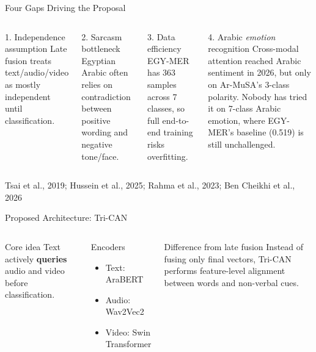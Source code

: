 \documentclass[aspectratio=169,10pt]{beamer}
\newcommand{\term}[1]{\textbf{\textcolor{MidBlue}{#1}}}
\newcommand{\source}[1]{\vspace{0.05cm}\hfill{\scriptsize\textcolor{MutedGray}{#1}}}
\newcommand{\keytake}[1]{\vspace{0.3em}{\small #1}}
\begin{document}
\begin{frame}[t]{Four Gaps Driving the Proposal}
\begin{columns}[T,onlytextwidth]
\begin{block}{1. Independence assumption}
Late fusion treats text/audio/video as mostly independent until classification.
\end{block}
\begin{block}{2. Sarcasm bottleneck}
Egyptian Arabic often relies on contradiction between positive wording and negative tone/face.
\end{block}
\begin{block}{3. Data efficiency}
EGY-MER has 363 samples across 7 classes, so full end-to-end training risks overfitting.
\end{block}
\begin{block}{4. Arabic \emph{emotion} recognition}
Cross-modal attention reached Arabic sentiment in 2026, but only on Ar-MuSA's 3-class polarity. Nobody has tried it on 7-class Arabic emotion, where EGY-MER's baseline (0.519) is still unchallenged.
\end{block}
\end{columns}
\vspace{0.25cm}
\keytake{Tri-CAN is aimed at all four: modality interaction, sarcasm, small data, and emotion rather than sentiment.}
\source{Tsai et al., 2019; Hussein et al., 2025; Rahma et al., 2023; Ben Cheikhi et al., 2026}
\end{frame}

\begin{frame}[t]{Proposed Architecture: Tri-CAN}
\begin{columns}[T,onlytextwidth]
\centering
\resizebox{!}{0.72\textheight}{}
\begin{block}{Core idea}
Text actively \term{queries} audio and video before classification.
\end{block}
\begin{block}{Encoders}
\begin{itemize}
  \item Text: AraBERT
  \item Audio: Wav2Vec2
  \item Video: Swin Transformer
\end{itemize}
\end{block}
\begin{alertblock}{Difference from late fusion}
Instead of fusing only final vectors, Tri-CAN performs feature-level alignment between words and non-verbal cues.
\end{alertblock}
\end{columns}
\end{frame}
\end{document}
